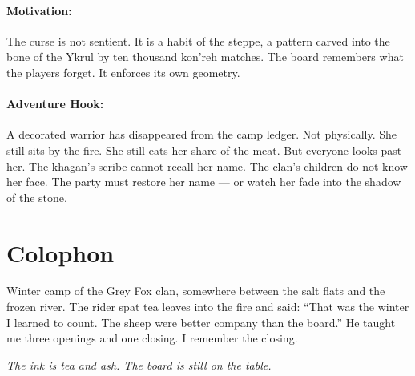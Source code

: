 \paragraph{Motivation:}

The curse is not sentient. It is a habit of the steppe, a pattern carved into the bone of the Ykrul by ten thousand kon'reh matches. The board remembers what the players forget. It enforces its own geometry.

\paragraph{Adventure Hook:}

A decorated warrior has disappeared from the camp ledger. Not physically. She still sits by the fire. She still eats her share of the meat. But everyone looks past her. The khagan's scribe cannot recall her name. The clan's children do not know her face. The party must restore her name --- or watch her fade into the shadow of the stone.

\section*{Colophon}

Winter camp of the Grey Fox clan, somewhere between the salt flats and the frozen river. The rider spat tea leaves into the fire and said: ``That was the winter I learned to count. The sheep were better company than the board.'' He taught me three openings and one closing. I remember the closing.

\noindent \textit{The ink is tea and ash. The board is still on the table.}